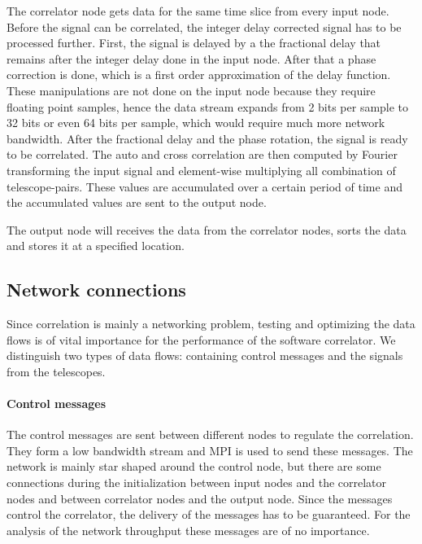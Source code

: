 The correlator node gets data for the same time slice from every input
node. Before the signal can be correlated, the integer delay corrected
signal has to be processed further. First, the signal is delayed by a
the fractional delay that remains after the integer delay done in the
input node. After that a phase correction is done, which is a first
order approximation of the delay function. These manipulations are not
done on the input node because they require floating point samples,
hence the data stream expands from 2 bits per sample to 32 bits or
even 64 bits per sample, which would require much more network
bandwidth. After the fractional delay and the phase rotation, the
signal is ready to be correlated. The auto and cross correlation are
then computed by Fourier transforming the input signal and
element-wise multiplying all combination of telescope-pairs. These
values are accumulated over a certain period of time and the
accumulated values are sent to the output node.

The output node will receives the data from the correlator nodes,
sorts the data and stores it at a specified location.

\subsection{Network connections}
Since correlation is mainly a networking problem, testing and
optimizing the data flows is of vital importance for the performance
of the software correlator. We distinguish two types of data flows:
containing control messages and the signals from the telescopes. 

\paragraph{Control messages}
The control messages are sent between different nodes to regulate the
correlation. They form a low bandwidth stream and MPI is used to send
these messages. The network is mainly star shaped around the control
node, but there are some connections during the initialization between
input nodes and the correlator nodes and between correlator nodes and
the output node. Since the messages control the correlator, the
delivery of the messages has to be guaranteed. For the analysis of the
network throughput these messages are of no importance.

